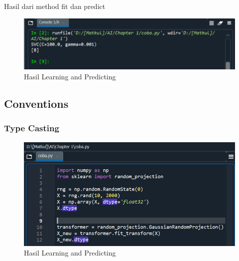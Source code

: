 \par Hasil dari method fit dan predict

    \begin{figure}[H]
    \centering
    \includegraphics[width=13cm]{figures/1184023/13.PNG}
    \caption{Hasil Learning and Predicting}
    \end{figure}

\subsection{Conventions}

\subsubsection{Type Casting}

    \begin{figure}[H]
    \centering
    \includegraphics[width=13cm]{figures/1184023/15.PNG}
    \caption{Hasil Learning and Predicting}
    \end{figure}
    
